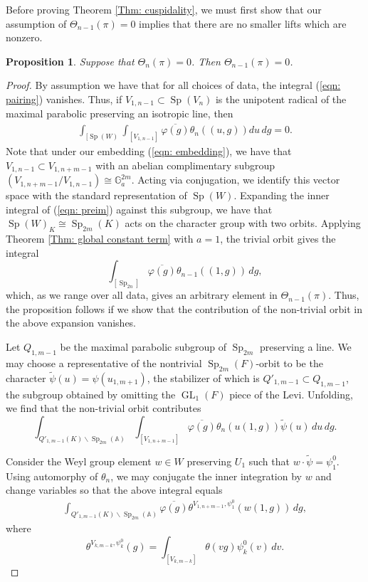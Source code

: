 \documentclass[11pt,reqno]{amsart}
\newtheorem{Prop}[Thm]{Proposition}
\theoremstyle{definition}
\theoremstyle{remark}
\theoremstyle{definition}
\begin{document}
Before proving Theorem \ref{Thm: cuspidality}, we must first show that our assumption of $\Theta_{n-1}(\pi)=0$ implies that there are no smaller lifts which are nonzero. 

\begin{Prop}\label{Prop: inductive}
Suppose that $\Theta_{n}(\pi) =0$. Then $\Theta_{n-1}(\pi) = 0$.
\end{Prop}
\begin{proof}
By assumption we have that for all choices of data, the integral (\ref{eqn: pairing}) vanishes. Thus, if $V_{1,n-1}\subset \operatorname{Sp}(V_n)$ is the unipotent radical of the maximal parabolic preserving an isotropic line, then
\begin{align}\label{eqn: preim}
\int_{[\operatorname{Sp}(W)}\int_{[V_{1,n-1}]}\overline{\varphi(g)}\theta_{n}((u,g))du\,dg = 0.
\end{align}
Note that under our embedding (\ref{eqn: embedding}), we have that $V_{1,n-1}\subset V_{1,n+m-1}$ with an abelian complimentary subgroup $\left(V_{1,n+m-1}/V_{1,n-1}\right) \cong \mathbb{G}_a^{2m}$. Acting via conjugation, we identify this vector space with the standard representation of $\operatorname{Sp}(W)$. Expanding the inner integral of (\ref{eqn: preim}) against this subgroup, we have that $\operatorname{Sp}(W)_K\cong \operatorname{Sp}_{2m}(K)$ acts on the character group with two orbits. Applying Theorem \ref{Thm: global constant term} with $a=1$, the trivial orbit gives the integral
\[
\int_{[\operatorname{Sp}_{2n}]}\overline{\varphi(g)}\theta_{n-1}((1,g))\,dg,
\]
which, as we range over all data, gives an arbitrary element in $\Theta_{n-1}(\pi)$. Thus, the proposition follows if we show that the contribution of the non-trivial orbit in the above expansion vanishes.

Let $Q_{1,m-1}$ be the maximal parabolic subgroup of $\operatorname{Sp}_{2m}$ preserving a line. We may choose a representative of the nontrivial $\operatorname{Sp}_{2m}(F)$-orbit to be the character $\tilde{\psi}(u) = \psi(u_{1,m+1})$, the stabilizer of which is $Q'_{1,m-1}\subset Q_{1,m-1}$, the subgroup obtained by omitting the $\operatorname{GL}_1(F)$ piece of the Levi. Unfolding, we find that the non-trivial orbit contributes
\[
	\int_{Q'_{1,m-1}(K)\backslash\operatorname{Sp}_{2m}({\mathbb A})}\int_{[V_{1,n+m-1}]}\overline{\varphi(g)}\theta_{n}(u(1,g))\tilde{\psi}(u)\,du\,dg.
\]

Consider the Weyl group element $w\in W$ preserving $U_1$ such that $w\cdot \tilde{\psi} = \psi_1^0$. 
Using automorphy of $\theta_{n}$,  we may conjugate the inner integration by $w$ and change variables so that the above integral equals
\begin{align}\label{eqn: P^0}
\int_{Q'_{1,m-1}(K)\backslash\operatorname{Sp}_{2m}({\mathbb A})}\overline{\varphi(g)}\theta^{V_{1,n+m-1},\psi^0_{1}}(w(1,g))\,dg,
\end{align}
 where 
\[
\theta^{V_{k,m-k},\psi^0_{k}}(g) = \int_{[V_{k,m-k}]}\theta(vg)\psi^0_{k}(v)\,dv.
\]


\end{proof}
\end{document}
